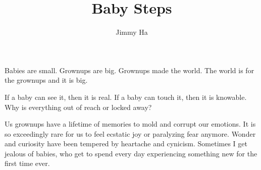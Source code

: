 \documentclass[14pt, letterpaper]{extarticle}
\begin{document}
 \title{\Large{\textbf{Baby Steps}}}
 \author{\vspace{-2cm}Jimmy Ha}
 \date{}
  
\maketitle

Babies are small. Grownups are big. Grownups made the world. The world is for the grownups and it is big. 


If a baby can see it, then it is real. If a baby can touch it, then it is knowable. Why is everything out of reach or locked away?

Us grownups have a lifetime of memories to mold and corrupt our emotions. It is so exceedingly rare for us to feel ecstatic joy or paralyzing fear anymore. Wonder and curiosity have been tempered by heartache and cynicism. Sometimes I get jealous of babies, who get to spend every day experiencing something new for the first time ever.
  
 

  
  
\end{document}
